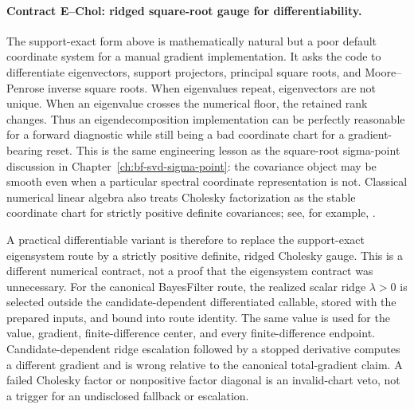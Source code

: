\paragraph{Contract E--Chol: ridged square-root gauge for differentiability.}
The support-exact form above is mathematically natural but a poor default
coordinate system for a manual gradient implementation.  It asks the code to
differentiate eigenvectors, support projectors, principal square roots, and
Moore--Penrose inverse square roots.  When eigenvalues repeat, eigenvectors are
not unique.  When an eigenvalue crosses the numerical floor, the retained rank
changes.  Thus an eigendecomposition implementation can be perfectly reasonable
for a forward diagnostic while still being a bad coordinate chart for a
gradient-bearing reset.  This is the same engineering lesson as the
square-root sigma-point discussion in Chapter~\ref{ch:bf-svd-sigma-point}: the
covariance object may be smooth even when a particular spectral coordinate
representation is not.  Classical numerical linear algebra also treats Cholesky
factorization as the stable coordinate chart for strictly positive definite
covariances; see, for example, \citet{higham2002accuracy}.

A practical differentiable variant is therefore to replace the support-exact
eigensystem route by a strictly positive definite, ridged Cholesky gauge.  This
is a different numerical contract, not a proof that the eigensystem contract was
unnecessary.  For the canonical BayesFilter route, the realized scalar ridge
\(\lambda>0\) is selected outside the candidate-dependent differentiated
callable, stored with the prepared inputs, and bound into route identity.  The
same value is used for the value, gradient, finite-difference center, and every
finite-difference endpoint.  Candidate-dependent ridge escalation followed by a
stopped derivative computes a different gradient and is wrong relative to the
canonical total-gradient claim.  A failed Cholesky factor or nonpositive factor
diagonal is an invalid-chart veto, not a trigger for an undisclosed fallback or
escalation.

